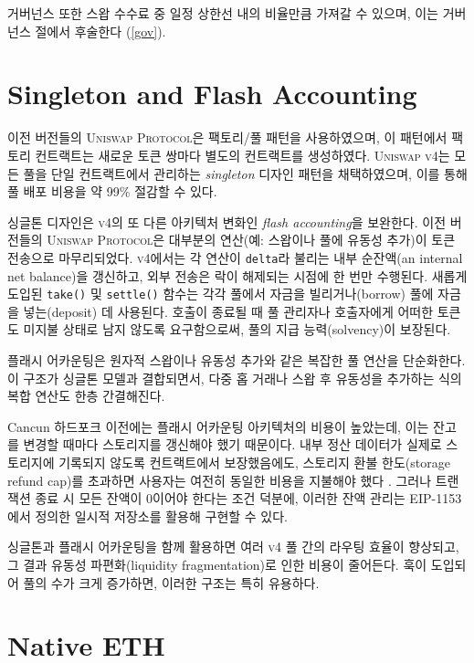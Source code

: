 \documentclass[sigconf,nonacm,prologue,table]{acmart}
\numberwithin{equation}{section}
\theoremstyle{definition}
\theoremstyle{remark}
\begin{document}
거버넌스 또한 스왑 수수료 중 일정 상한선 내의 비율만큼 가져갈 수 있으며, 이는 거버넌스 절에서 후술한다 (\ref{gov}).

\section{Singleton and Flash Accounting} \label{flashaccounting}

이전 버전들의 \textsc{Uniswap Protocol}은 팩토리/풀 패턴을 사용하였으며, 이 패턴에서 팩토리 컨트랙트는 새로운 토큰 쌍마다 별도의 컨트랙트를 생성하였다. \textsc{Uniswap v4}는 모든 풀을 단일 컨트랙트에서 관리하는 \emph{singleton} 디자인 패턴을 채택하였으며, 이를 통해 풀 배포 비용을 약 99\% 절감할 수 있다.

싱글톤 디자인은 \textsc{v4}의 또 다른 아키텍처 변화인 \emph{flash accounting}을 보완한다. 이전 버전들의 \textsc{Uniswap Protocol}은 대부분의 연산(예: 스왑이나 풀에 유동성 추가)이 토큰 전송으로 마무리되었다. \textsc{v4}에서는 각 연산이 \verb|delta|라 불리는 내부 순잔액(an internal net balance)을 갱신하고, 외부 전송은 락이 해제되는 시점에 한 번만 수행된다. 새롭게 도입된 \verb|take()| 및 \verb|settle()| 함수는 각각 풀에서 자금을 빌리거나(borrow) 풀에 자금을 넣는(deposit) 데 사용된다. 호출이 종료될 때 풀 관리자나 호출자에게 어떠한 토큰도 미지불 상태로 남지 않도록 요구함으로써, 풀의 지급 능력(solvency)이 보장된다.

플래시 어카운팅은 원자적 스왑이나 유동성 추가와 같은 복잡한 풀 연산을 단순화한다. 이 구조가 싱글톤 모델과 결합되면서, 다중 홉 거래나 스왑 후 유동성을 추가하는 식의 복합 연산도 한층 간결해진다.

Cancun 하드포크 이전에는 플래시 어카운팅 아키텍처의 비용이 높았는데, 이는 잔고를 변경할 때마다 스토리지를 갱신해야 했기 때문이다. 내부 정산 데이터가 실제로 스토리지에 기록되지 않도록 컨트랙트에서 보장했음에도, 스토리지 환불 한도(storage refund cap)를 초과하면 사용자는 여전히 동일한 비용을 지불해야 했다 \cite{Buterin2021}. 그러나 트랜잭션 종료 시 모든 잔액이 0이어야 한다는 조건 덕분에, 이러한 잔액 관리는 EIP-1153 \cite{Akhunov2018}에서 정의한 일시적 저장소를 활용해 구현할 수 있다.

싱글톤과 플래시 어카운팅을 함께 활용하면 여러 \textsc{v4} 풀 간의 라우팅 효율이 향상되고, 그 결과 유동성 파편화(liquidity fragmentation)로 인한 비용이 줄어든다. 훅이 도입되어 풀의 수가 크게 증가하면, 이러한 구조는 특히 유용하다.

\section{Native ETH} 
\label{nativeeth}
\end{document}
